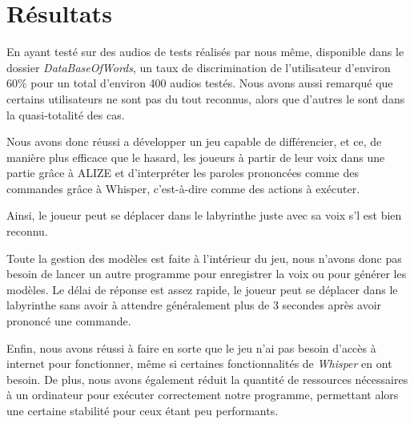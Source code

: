 \section{Résultats}
\label{sec:resultats}

En ayant testé sur des audios de tests réalisés par nous même, disponible dans le dossier \textit{DataBaseOfWords}, un taux de discrimination de l'utilisateur d'environ 60\% pour un total d'environ 400 audios testés. Nous avons aussi remarqué que certains utilisateurs ne sont pas du tout reconnus, alors que d'autres le sont dans la quasi-totalité des cas.

Nous avons donc réussi a développer un jeu capable de différencier, et ce, de manière plus efficace que le hasard, les joueurs à partir de leur voix dans une partie grâce à ALIZE et d'interpréter les paroles prononcées comme des commandes grâce à Whisper, c'est-à-dire comme des
actions à exécuter. 

Ainsi, le joueur peut se déplacer dans le labyrinthe juste avec sa voix s'l est bien reconnu. 

Toute la gestion des modèles est faite à l'intérieur du jeu, nous n'avons donc pas besoin de lancer un autre programme pour enregistrer la voix ou pour générer les modèles. 
Le délai de réponse est assez rapide, le joueur peut se déplacer dans le labyrinthe sans avoir à attendre généralement plus de 3 secondes après avoir prononcé une commande. 

Enfin, nous avons réussi à faire en sorte que le jeu n'ai pas besoin d'accès à internet pour fonctionner, même si certaines fonctionnalités de \textit{Whisper} en ont besoin.
De plus, nous avons également réduit la quantité de ressources nécessaires à un ordinateur pour exécuter correctement notre programme, permettant alors une certaine stabilité pour ceux étant peu performants.

